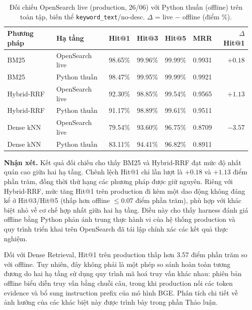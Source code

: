 \begin{table}[H]
  \centering
  \small
  \caption{Đối chiếu OpenSearch live (production, 26/06) với Python thuần (offline) trên toàn tập, biến thể \texttt{keyword\_text}/no-desc. $\Delta$ = live $-$ offline (điểm \%).}
  \label{tab:livevsoffline}
  \begin{tabular}{llccccr}
    \toprule
    \textbf{Phương pháp} & \textbf{Hạ tầng} & \textbf{Hit@1} & \textbf{Hit@3} & \textbf{Hit@5} & \textbf{MRR} & \textbf{$\Delta$Hit@1} \\
    \midrule
    BM25                 & OpenSearch live  & 98.65\%        & 99.96\%        & 99.99\%        & 0.9931       & $+0.18$                \\
    BM25                 & Python thuần     & 98.47\%        & 99.95\%        & 99.99\%        & 0.9921       &                        \\
    Hybrid-RRF           & OpenSearch live  & 92.30\%        & 98.85\%        & 99.54\%        & 0.9565       & $+1.13$                \\
    Hybrid-RRF           & Python thuần     & 91.17\%        & 98.89\%        & 99.61\%        & 0.9511       &                        \\
    Dense kNN            & OpenSearch live  & 79.54\%        & 93.60\%        & 96.75\%        & 0.8709       & $-3.57$                \\
    Dense kNN            & Python thuần     & 83.11\%        & 94.41\%        & 96.82\%        & 0.8911       &                        \\
    \bottomrule
  \end{tabular}
\end{table}

\textbf{Nhận xét.} Kết quả đối chiếu cho thấy BM25 và Hybrid-RRF đạt mức độ nhất quán cao giữa hai hạ tầng. Chênh lệch Hit@1 chỉ lần lượt là $+0.18$ và $+1.13$ điểm phần trăm, đồng thời thứ hạng các phương pháp được giữ nguyên. Riêng với Hybrid-RRF, mức tăng Hit@1 trên production đi kèm một dao động không đáng kể ở Hit@3/Hit@5 (thấp hơn offline $\le 0.07$ điểm phần trăm), phù hợp với khác biệt nhỏ về cơ chế hợp nhất giữa hai hạ tầng. Điều này cho thấy harness đánh giá offline bằng Python phản ánh trung thực hành vi của hệ thống production và quy trình triển khai trên OpenSearch đã tái lập chính xác các kết quả thực nghiệm.

Đối với Dense Retrieval, Hit@1 trên production thấp hơn 3.57 điểm phần trăm so với offline. Tuy nhiên, đây không phải là một phép so sánh hoàn toàn tương đương do hai hạ tầng sử dụng quy trình mã hoá truy vấn khác nhau: phiên bản offline biểu diễn truy vấn bằng chuỗi câu, trong khi production nối các token evidence và bổ sung instruction prefix của mô hình BGE. Phân tích chi tiết về ảnh hưởng của các khác biệt này được trình bày trong phần Thảo luận.

